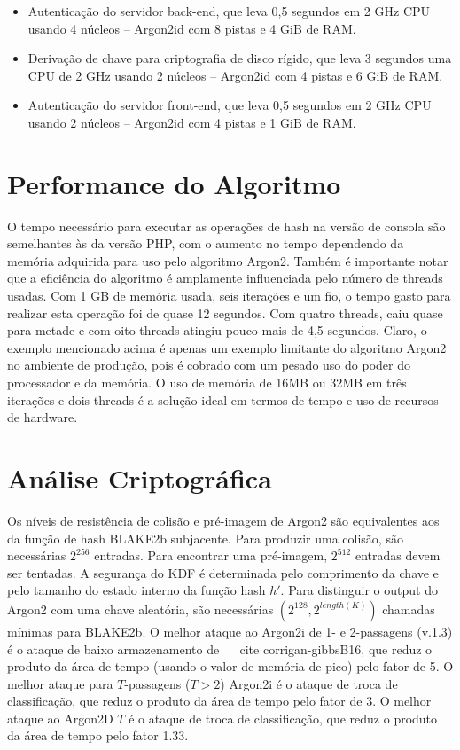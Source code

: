 \documentclass[conference]{IEEEtran}
\begin{document}
\begin{itemize}
\item Autenticação do servidor back-end, que leva 0,5 segundos em 2 GHz
CPU usando 4 núcleos -- Argon2id com 8 pistas e 4 GiB de RAM.
\item Derivação de chave para criptografia de disco rígido, que leva 3 segundos
uma CPU de 2 GHz usando 2 núcleos -- Argon2id com 4 pistas e 6 GiB de
RAM.
\item Autenticação do servidor front-end, que leva 0,5 segundos em 2 GHz
CPU usando 2 núcleos -- Argon2id com 4 pistas e 1 GiB de RAM.
\end{itemize} \cite{rfc9106}

\section{Performance do Algoritmo}

O tempo necessário para executar as operações de hash na versão de consola são 
semelhantes às da versão PHP, com o aumento no tempo dependendo da memória 
adquirida para uso pelo algoritmo Argon2. Também é importante notar que a eficiência 
do algoritmo é amplamente influenciada pelo número de threads usadas. Com 1 GB de memória 
usada, seis iterações e um fio, o tempo gasto para realizar esta operação foi 
de quase 12 segundos. Com quatro threads, caiu quase para metade e com oito threads 
atingiu pouco mais de 4,5 segundos. Claro, o exemplo mencionado acima é apenas um exemplo 
limitante do algoritmo Argon2 no ambiente de produção, pois é cobrado com um pesado uso 
do poder do processador e da memória. O uso de memória de 16MB ou 32MB em três 
iterações e dois threads é a solução ideal em termos de tempo e uso de recursos 
de hardware. \cite{duka2020elliptic}

\section{Análise Criptográfica}

Os níveis de resistência de colisão e pré-imagem de Argon2 são equivalentes aos da função 
de hash BLAKE2b subjacente. Para produzir uma colisão, são necessárias $2^{256}$ entradas. 
Para encontrar uma pré-imagem, $2^{512}$ entradas devem ser tentadas.
A segurança do KDF é determinada pelo comprimento da chave e pelo tamanho do estado interno 
da função hash $h'$. Para distinguir o output do Argon2 com uma chave aleatória, são necessárias 
$(2^{128},2^{length(K)})$ chamadas mínimas para BLAKE2b.
O melhor ataque ao Argon2i de 1- e 2-passagens (v.1.3) é o ataque de baixo armazenamento 
de ~ \ cite {corrigan-gibbsB16}, que reduz o produto da área de tempo (usando o valor de 
memória de pico) pelo fator de 5. O melhor ataque para $T$-passagens ($T>2$) Argon2i é o 
ataque de troca de classificação, que reduz o produto da área de tempo pelo fator de 3.
O melhor ataque ao Argon2D $ T $  é o ataque de troca de classificação, que reduz 
o produto da área de tempo pelo fator 1.33. \cite{argon2spec}
\end{document}
